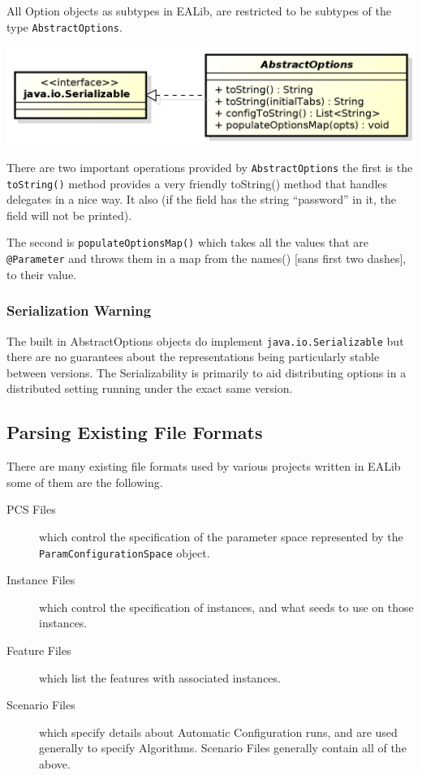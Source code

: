 \documentclass[11pt,letterpaper,oneside]{article}
\begin{document}
All Option objects as subtypes in EALib, are restricted to be subtypes of the type \texttt{AbstractOptions}.
\begin{center}
\includegraphics[scale=0.75]{img/UML/AbstractOptions.png}
\end{center}

There are two important operations provided by \texttt{AbstractOptions} the first is the \texttt{toString()} method provides a very friendly toString() method that handles delegates in a nice way. It also (if the field has the string ``password'' in it, the field will not be printed).

The second is \texttt{populateOptionsMap()} which takes all the values that are \texttt{@Parameter} and throws them in a map from the names() [sans first two dashes], to their value.

\subsubsection*{Serialization Warning}

The built in AbstractOptions objects do implement \texttt{java.io.Serializable} but there are no guarantees about the representations being particularly stable between versions. The Serializability is primarily to aid distributing options in a distributed setting running under the exact same version. 

\subsection{Parsing Existing File Formats}

There are many existing file formats used by various projects written in EALib some of them are the following.

\begin{description}
\item[PCS Files] which control the specification of the parameter space represented by the \texttt{ParamConfigurationSpace} object.
\item[Instance Files] which control the specification of instances, and what seeds to use on those instances.
\item[Feature Files] which list the features with associated instances.
\item[Scenario Files] which specify details about Automatic Configuration runs, and are used generally to specify Algorithms. Scenario Files generally contain all of the above.
\end{description}
\end{document}
